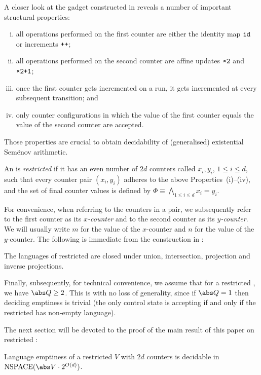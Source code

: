 

A closer look at the gadget constructed in
 reveals a number of important structural
properties:
%
\begin{enumerate}[(i)]
\item all operations performed on the first counter are either the
  identity map ${\normalfont{\texttt{{id}}}}$ or increments ${\normalfont{\texttt{{++}}}}$;
\item all operations performed on the second counter are affine
  updates $\wTT$ and $\wTTPO$;
\item once the first counter gets incremented on a run, it gets
  incremented at every subsequent transition; and
\item only counter configurations in which the value of the first
  counter equals the value of the second counter are accepted.
\end{enumerate}
%
Those properties are crucial to obtain decidability of (generalised)
existential Sem{\"e}nov arithmetic. 
%
\begin{definition}
  An \laVASS is \emph{restricted} if it has an even number of $2d$
  counters called $x_i,y_i$, $1\le i\le d$, such that every counter
  pair $(x_i,y_i)$ adheres to the above Properties~(i)--(iv), and the
  set of final counter values is defined by
  $\Phi \equiv \bigwedge_{1\le i\le d} x_i=y_i$.
\end{definition}
%
For convenience, when referring to the counters in a pair, we
subsequently refer to the first counter as its \emph{$x$-counter} and to
the second counter as its \emph{$y$-counter}. We will usually write $m$
for the value of the $x$-counter and $n$ for the value of the
$y$-counter. The following is immediate from the construction in
:
%
\begin{proposition}
The languages of restricted \laVASS are closed under union,
intersection, projection and inverse projections.
\end{proposition}
%
Finally, subsequently, for technical convenience, we assume that for a
restricted \laVASS, we have $\abs Q\ge 2$. This is with no loss of
generality, since if $\abs Q=1$ then deciding emptiness is trivial
(the only control state is accepting if and only if the restricted
\laVASS has non-empty language).

The next section will be devoted to the proof of the main result of
this paper on restricted \laVASS:
%
\begin{proposition}\label{prop:main}
  Language emptiness of a restricted \laVASS $V$ with $2d$ counters is
  decidable in $\mathrm{NSPACE}( \abs V \cdot 2^{O(d)})$.
\end{proposition}
%

